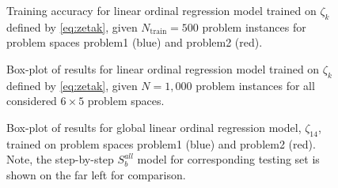 \begin{figure}\centering
	\caption{Training accuracy for linear ordinal regression model trained on $\zeta_k$ defined by \cref{eq:zetak}, given $N_{\text{train}}=500$ problem instances for problem spaces problem{1} (blue) and problem{2} (red).}
	\label{fig:global:tracc}
\end{figure}

\begin{figure}\centering
\end{figure}

\begin{figure}\centering
	\ContinuedFloat 
\end{figure}

\begin{figure} \centering
	\ContinuedFloat 
\end{figure}

\begin{figure}\centering
	\ContinuedFloat 
\end{figure}

\begin{figure}\centering
	\ContinuedFloat 
	\caption{Box-plot of results for linear ordinal regression model trained on $\zeta_k$ defined by \cref{eq:zetak}, given $N=1,000$ problem instances for all considered $6\times5$ problem spaces.}\label{fig:stepbystep:boxplot}
\end{figure}



\begin{figure}\centering
	\caption{Box-plot of results for global linear ordinal regression model, $\zeta_{14}$, trained on problem spaces problem{1} (blue) and problem{2} (red). Note, the step-by-step $S_b^{all}$ model for corresponding testing set is shown on the far left for comparison.}
	\label{fig:global}
\end{figure}

